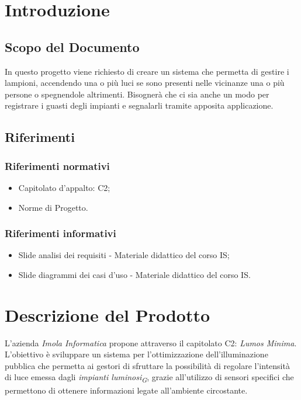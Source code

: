 \documentclass[a4paper, 12pt]{article}
\begin{document}
\makeindexdetails
\makefrontpage \makeversioni
\tableofcontents
\newpage
\clearpage
{} 

\section{Introduzione}
\subsection{Scopo del Documento}
In questo progetto viene richiesto di creare un sistema che permetta di gestire i lampioni, accendendo una o più luci se sono presenti nelle vicinanze una o più persone o spegnendole altrimenti.\newline
Bisognerà che ci sia anche un modo per registrare i guasti degli impianti e segnalarli tramite apposita applicazione.

\subsection{Riferimenti}
\subsubsection*{Riferimenti normativi}
\begin{itemize}
    \item Capitolato d'appalto: C2; 
    \item Norme di Progetto.
\end{itemize}

\subsubsection*{Riferimenti informativi}
\begin{itemize}
    \item Slide analisi dei requisiti - Materiale didattico del corso IS;
    \item Slide diagrammi dei casi d'uso - Materiale didattico del corso IS.
\end{itemize}
\newpage
\section{Descrizione del Prodotto}
L'azienda \textit{Imola Informatica} propone attraverso il capitolato C2:
\textit{Lumos Minima}. L'obiettivo è sviluppare un sistema per l'ottimizzazione
dell'illuminazione pubblica che permetta ai gestori di sfruttare la possibilità
di regolare l'intensità di luce emessa dagli \textit{impianti luminosi\textsubscript{G}}, grazie all'utilizzo di
sensori specifici che permettono di ottenere informazioni legate all'ambiente circostante.
\end{document}
